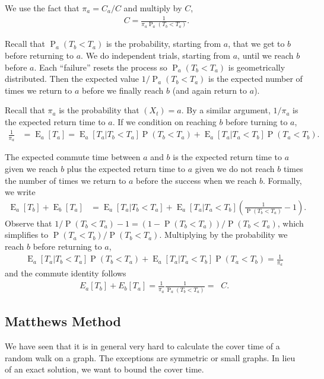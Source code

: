 \documentclass[12pt]{article}
\theoremstyle{definition}
\DeclareMathOperator{\E}{\mathrm{E}}		     %
\DeclareMathOperator{\pr}{\mathrm{P}}		     %
\DeclareMathOperator{\Reff}{R_{\textrm{eff}}}    %
\begin{document}
We use the fact that $\pi_a = C_a / C$ and multiply by $C$,
\begin{align}
\Reff C = \frac{1}{\pi_a \pr_a(T_b < T_a)}. \nonumber
\end{align}

Recall that $\pr_a(T_b < T_a)$ is the probability, starting from $a$,
that we get to $b$ before returning to $a$.
We do independent trials, starting from $a$, until we reach $b$ before $a$.
Each ``failure'' resets the process so $\pr_a(T_b < T_a)$ is geometrically distributed.
Then the expected value $1/\pr_a(T_b < T_a)$ is the expected number of times
we return to $a$ before we finally reach $b$ (and again return to $a$).

Recall that $\pi_a$ is the probability that $(X_t) = a$.
By a similar argument, $1/\pi_a$ is the expected return time to $a$.
If we condition on reaching $b$ before turning to $a$,
\begin{align}
\frac{1}{\pi_a} &= \E_a[T_a] =
\E_a[T_a|T_b < T_a] \pr(T_b<T_a) +
\E_a[T_a|T_a < T_b] \pr(T_a<T_b) \nonumber.
\end{align}

The expected commute time between $a$ and $b$ is the
expected return time to $a$ given we reach $b$ plus
the expected return time to $a$ given we do not reach $b$ times
the number of times we return to $a$ before the success when
we reach $b$.
Formally, we write
\begin{align}
\E_a[T_b] + \E_b[T_a] &= 
\E_a[T_a | T_b < T_a] + 
\E_a[T_a | T_a < T_b] (\frac{1}{\pr(T_b<T_a)} - 1) \nonumber.
\end{align}
Observe that $1/\pr(T_b<T_a)-1 = (1-\pr(T_b<T_a))/\pr(T_b<T_a)$, 
which simplifies to $\pr(T_a<T_b)/\pr(T_b<T_a)$.
Multiplying by the probability we reach $b$ before returning to $a$,
\begin{align}
\E_a[T_a|T_b < T_a] \pr(T_b<T_a) + \E_a[T_a|T_a<T_b] \pr(T_a<T_b)=\frac{1}{\pi_a} \nonumber
\end{align}
and the commute identity follows
\begin{align}
E_a[T_b] + E_b[T_a] = \frac{1}{\pi_a}\frac{1}{\pr_a(T_b < T_a)} = \Reff C.
\label{eqn:commute}
\end{align}

\subsection{Matthews Method}\label{sec:matthews}
We have seen that it is in general very hard
to calculate the cover time of a random walk
on a graph.
The exceptions are symmetric or small graphs.
In lieu of an exact solution, we want to 
bound the cover time.
\end{document}
